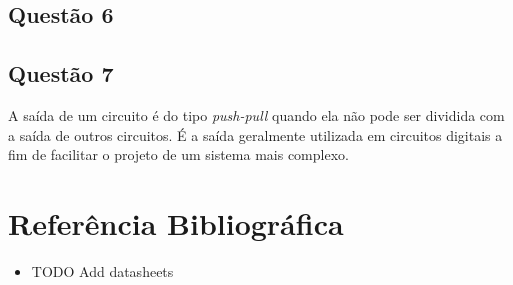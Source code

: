 \documentclass[12pt, a4paper, twoside]{article}
\begin{document}
\subsection{Questão 6}


\subsection{Questão 7}

A saída de um circuito é do tipo \textit{push-pull} quando ela não pode ser dividida com a saída de outros circuitos. É a saída geralmente utilizada em circuitos digitais a fim de facilitar o projeto de um sistema mais complexo.

\section{Referência Bibliográfica}

\begin{itemize}
    \item TODO Add datasheets
\end{itemize}
\end{document}

